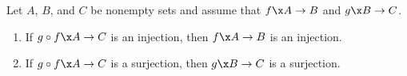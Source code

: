 \begin{activity}
\begin{theorem} \label{T:morecompositefunctions}
Let  $A$, $B$, and $C$ be nonempty sets and assume that $f\x A \to B$ and  $g\x B \to C$.

\begin{enumerate}
\item If  $g \circ f\x A \to C$  is an injection, then  $f\x A \to B$  is an injection. \label{T:morecompositefunctions1}

\item If  $g \circ f\x A \to C$ is a surjection, then  $g\x B \to C$ is a surjection. \label{T:morecompositefunctions2}
\end{enumerate}
\end{theorem}
\end{activity}
\hbreak

\endinput

